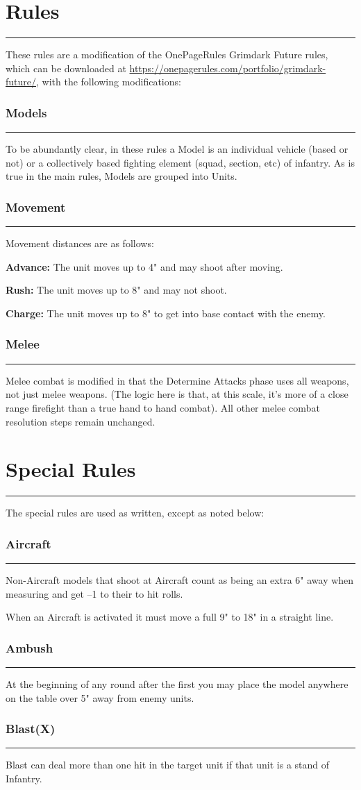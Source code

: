 \documentclass[11pt]{article}
\newcommand{\mysection}[1]{
  \section*{\centering #1}
  \raggedright
  \hrule
  \bigskip

}
\newcommand{\myheading}[1]{
  \subsubsection*{\centering #1}
  \raggedright
  \hrule
}
\renewenvironment{description}
  {\list{}{\labelwidth=0pt \leftmargin=0pt
   \let\makelabel\descriptionlabel}}
  {\endlist}
\newenvironment{mydescription}{
\begin{description}
  \setlength{\itemsep}{1pt}
  \setlength{\parskip}{0pt}
  \setlength{\parsep}{0pt}}{\end{description}
}
\begin{document}
\begin{multicols*}{3}[]
\mysection{Rules}

These rules are a modification of the OnePageRules Grimdark Future rules, which
can be downloaded at \url{https://onepagerules.com/portfolio/grimdark-future/},
with the following modifications:

\myheading{Models}

To be abundantly clear, in these rules a Model is an individual vehicle (based
or not) or a collectively based fighting element (squad, section, etc) of
infantry. As is true in the main rules, Models are grouped into Units.

\myheading{Movement}

Movement distances are as follows:

\begin{mydescription}

\item{\bf Advance:} The unit moves up to 4" and may shoot after moving.
\item{\bf Rush:} The unit moves up to 8" and may not shoot.
\item{\bf Charge:} The unit moves up to 8" to get into base contact with the
enemy.

\end{mydescription}

\myheading{Melee}

Melee combat is modified in that the Determine Attacks phase uses all weapons,
not just melee weapons. (The logic here is that, at this scale, it's more of a
close range firefight than a true hand to hand combat). All other melee combat
resolution steps remain unchanged.

\mysection{Special Rules}

The special rules are used as written, except as noted below:

\myheading{Aircraft}

Non-Aircraft models that shoot at Aircraft count as being an extra 6" away when
measuring and get –1 to their to hit rolls.

\smallskip

When an Aircraft is activated it must move a full 9" to 18" in a straight line.

\myheading{Ambush}

At the beginning of any round after the first you may place the model anywhere
on the table over 5" away from enemy units.

\myheading{Blast(X)}

Blast can deal more than one hit in the target unit if that unit is a stand of
Infantry.


\end{multicols*}
\end{document}
